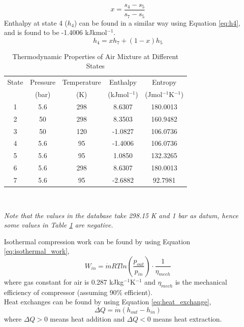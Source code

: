         \begin{equation}
            x = \frac{s_4 - s_5}{s_7 - s_5}
            \label{eq:liquidfraction}
        \end{equation}
        Enthalpy at state 4 ($h_4$) can be found in a similar way using Equation \ref{eq:h4}, and is found to be -1.4006 kJkmol$^{-1}$.
        \begin{equation}
            h_4 = xh_7+(1-x)h_5
            \label{eq:h4}
        \end{equation}
        \begin{table}[H]
            \singlespacing
        	\centering
    	    \caption{Thermodynamic Properties of Air Mixture at Different States \citep{nist}}
    	    \label{table:air_thermodata}
    	    \begin{tabular}{|c|cc|cc|}
    	    \hline
    	    State   & Pressure  & Temperature   & Enthalpy  & Entropy \\
    	            & (bar)     & (K)           & (kJmol$^{-1}$) & (Jmol$^{-1}$K$^{-1}$) \\
    	    \hline
    	    1       & 5.6       & 298           & 8.6307    & 180.0013 \\
    	    2       & 50        & 298           & 8.3503    & 160.9482 \\
    	    3       & 50        & 120           & -1.0827   & 106.0736 \\
    	    4       & 5.6       & 95            & -1.4006   & 106.0736 \\
    	    5       & 5.6       & 95            & 1.0850    & 132.3265 \\
    	    6       & 5.6       & 298           & 8.6307    & 180.0013 \\
    	    7       & 5.6       & 95            & -2.6882   & 92.7981 \\    \hline
    	    \end{tabular} \\
	        \vspace{1ex}
            \raggedright \emph{Note that the values in the database take 298.15 K and 1 bar as datum, hence some values in Table \ref{table:air_thermodata} are negative.}\\
    	\end{table}
        \noindent Isothermal compression work can be found by using Equation \ref{eq:isothermal_work},
        \begin{equation}
            W_{in} = \dot{m} RT ln\left(\frac{p_{out}}{p_{in}}\right)\cdot\frac{1}{\eta_{mech}}
            \label{eq:isothermal_work}
        \end{equation}
        where gas constant for air is 0.287 kJkg$^{-1}$K$^{-1}$ \citep{HLT} and ${\eta}_{mech}$ is the mechanical efficiency of compressor (assuming 90\% efficient). \\
        Heat exchanges can be found by using Equation \ref{eq:heat_exchange},
        \begin{equation}
            \Delta Q = \dot{m} (h_{out} - h_{in})
            \label{eq:heat_exchange}
        \end{equation}
        where $\Delta Q > 0$ means heat addition and $\Delta Q < 0$ means heat extraction. \\
        
